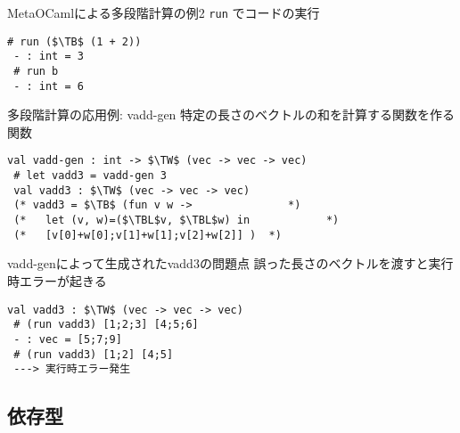 \documentclass[dvipdfmx,aspectratio=169, 20pt]{beamer}
\begin{document}
\begin{frame}[fragile]{MetaOCamlによる多段階計算の例2}
    \verb|run| でコードの実行
    \begin{exampleblock}{}
        \begin{Verbatim}[commandchars=\\\{\},codes={\catcode`$=3\catcode`^=7}]
 # run ($\TB$ (1 + 2))
 - : int = 3
 # run b
 - : int = 6
        \end{Verbatim}
    \end{exampleblock}
\end{frame}

\begin{frame}[fragile]{多段階計算の応用例: vadd-gen}
    特定の長さのベクトルの和を計算する関数を作る関数
    \begin{exampleblock}{}
        \begin{Verbatim}[commandchars=\\\{\},codes={\catcode`$=3\catcode`^=7}]
 val vadd-gen : int -> $\TW$ (vec -> vec -> vec)
 # let vadd3 = vadd-gen 3
 val vadd3 : $\TW$ (vec -> vec -> vec)
 (* vadd3 = $\TB$ (fun v w ->               *)
 (*   let (v, w)=($\TBL$v, $\TBL$w) in            *)
 (*   [v[0]+w[0];v[1]+w[1];v[2]+w[2]] )  *)
    \end{Verbatim}
    \end{exampleblock}
\end{frame}

\begin{frame}[fragile]{vadd-genによって生成されたvadd3の問題点}
    誤った長さのベクトルを渡すと実行時エラーが起きる
    \begin{exampleblock}{}
        \begin{Verbatim}[commandchars=\\\{\},codes={\catcode`$=3\catcode`^=7}]
 val vadd3 : $\TW$ (vec -> vec -> vec)
 # (run vadd3) [1;2;3] [4;5;6]
 - : vec = [5;7;9]
 # (run vadd3) [1;2] [4;5]
 ---> 実行時エラー発生
    \end{Verbatim}
    \end{exampleblock}
\end{frame}

\subsection{依存型}
\end{document}
